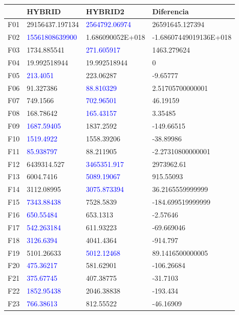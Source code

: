 \documentclass{article}
\begin{document}
\begin{table}[H]
	\centering
\begin{tabular}{|l|ll|l|}
	\hline
 {} &	HYBRID & HYBRID2 & Diferencia\\ \hline
F01  &	29156437.197134 & \textcolor{blue}{2564792.06974} & 26591645.127394\\
F02  &	\textcolor{blue}{15561808639900} & 1.686090052E+018 & -1.68607449019136E+018\\
F03  &	1734.885541 & \textcolor{blue}{271.605917} & 1463.279624\\
F04  &	19.992518944 & 19.992518944 & 0\\
F05  &	\textcolor{blue}{213.4051} & 223.06287 & -9.65777\\
F06  &	91.327386 & \textcolor{blue}{88.810329} & 2.51705700000001\\
F07  &	749.1566 & \textcolor{blue}{702.96501} & 46.19159\\
F08  &	168.78642 & \textcolor{blue}{165.43157} & 3.35485\\
F09  &	\textcolor{blue}{1687.59405} & 1837.2592 & -149.66515\\
F10  &	\textcolor{blue}{1519.4922} & 1558.39206 & -38.89986\\
F11  &	\textcolor{blue}{85.938797} & 88.211905 & -2.27310800000001\\
F12  &	6439314.527 & \textcolor{blue}{3465351.917} & 2973962.61\\
F13  &	6004.7416 & \textcolor{blue}{5089.19067} & 915.55093\\
F14  &	3112.08995 & \textcolor{blue}{3075.873394} & 36.2165559999999\\
F15  &	\textcolor{blue}{7343.88438} & 7528.5839 & -184.699519999999\\
F16  &	\textcolor{blue}{650.55484} & 653.1313 & -2.57646\\
F17  &	\textcolor{blue}{542.263184} & 611.93223 & -69.669046\\
F18  &	\textcolor{blue}{3126.6394} & 4041.4364 & -914.797\\
F19  &	5101.26633 & \textcolor{blue}{5012.12468} & 89.1416500000005\\
F20  &	\textcolor{blue}{475.36217} & 581.62901 & -106.26684\\
F21  &	\textcolor{blue}{375.67745} & 407.38775 & -31.7103\\
F22  &	\textcolor{blue}{1852.95438} & 2046.38838 & -193.434\\
F23  &	\textcolor{blue}{766.38613} & 812.55522 & -46.16909\\

\end{tabular}
\end{table}
\end{document}
